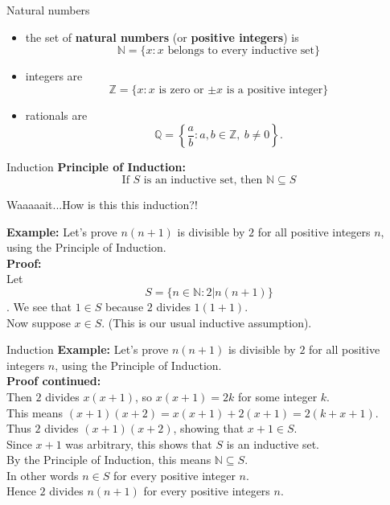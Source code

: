 \documentclass{beamer}
\begin{document}
\begin{frame}{Natural numbers}
\begin{itemize}
\pause
\item the set of \textbf{natural numbers} (or \textbf{positive integers}) is
$$\mathbb{N} = \{x: \text{$x$ belongs to every inductive set}\}$$
\pause
\item integers are
$$\mathbb{Z} = \{x: \text{$x$ is zero or $\pm x$ is a positive integer}\}$$
\pause
\item rationals are
$$\mathbb{Q} = \left\lbrace\frac{a}{b}: a,b\in\mathbb{Z},\ b\neq 0\right\rbrace.$$
\end{itemize}
\end{frame}

\begin{frame}{Induction}
\textbf{Principle of Induction:}
$$\text{If $S$ is an inductive set, then $\mathbb{N}\subseteq S$}$$
\pause
\begin{quest}
Waaaaait...How is this this induction?!
\end{quest}
\pause
\textbf{Example:} Let's prove $n(n+1)$ is divisible by $2$ for all positive integers $n$, using the Principle of Induction.\\
\pause
\textbf{Proof:}\\
\pause
Let
$$S = \{n\in\mathbb{N}: 2 | n(n+1)\}$$.
\pause
We see that $1\in S$ because $2$ divides $1(1+1)$.\\
\pause
Now suppose $x\in S$.  (This is our usual inductive assumption).\\
\end{frame}
\begin{frame}{Induction}
\textbf{Example:} Let's prove $n(n+1)$ is divisible by $2$ for all positive integers $n$, using the Principle of Induction.\\
\textbf{Proof continued:}\\
\pause
Then $2$ divides $x(x+1)$, so $x(x+1) = 2k$ for some integer $k$.\\
\pause
This means $(x+1)(x+2) = x(x+1) + 2(x+1) = 2(k+x+1)$.\\
\pause
Thus $2$ divides $(x+1)(x+2)$, showing that $x+1\in S$.\\
\pause
Since $x+1$ was arbitrary, this shows that $S$ is an inductive set.\\
\pause
By the Principle of Induction, this means $\mathbb{N}\subseteq S$.\\
\pause
In other words $n\in S$ for every positive integer $n$.\\
\pause
Hence $2$ divides $n(n+1)$ for every positive integers $n$.
\end{frame}
\end{document}
